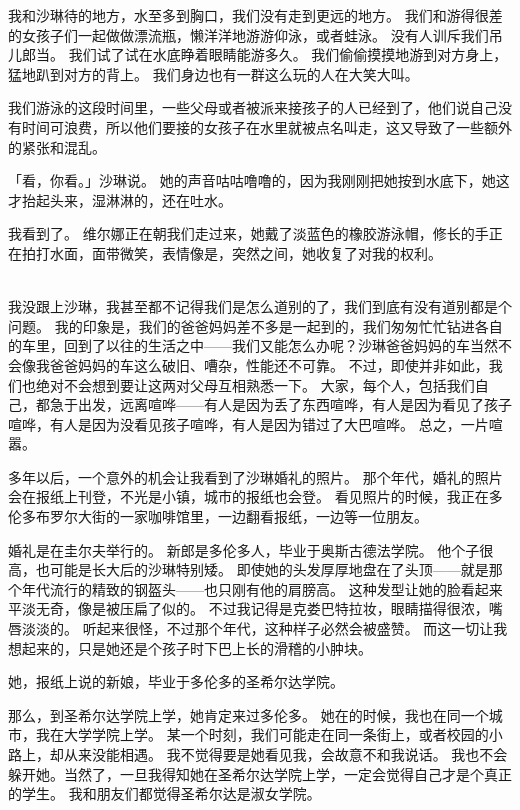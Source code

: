 \documentclass[UTF8]{ctexart}
\begin{document}
我和沙琳待的地方，水至多到胸口，我们没有走到更远的地方。
我们和游得很差的女孩子们一起做做漂流瓶，懒洋洋地游游仰泳，或者蛙泳。
没有人训斥我们吊儿郎当。
我们试了试在水底睁着眼睛能游多久。
我们偷偷摸摸地游到对方身上，猛地趴到对方的背上。
我们身边也有一群这么玩的人在大笑大叫。

我们游泳的这段时间里，一些父母或者被派来接孩子的人已经到了，他们说自己没有时间可浪费，所以他们要接的女孩子在水里就被点名叫走，这又导致了一些额外的紧张和混乱。

「看，你看。」沙琳说。
她的声音咕咕噜噜的，因为我刚刚把她按到水底下，她这才抬起头来，湿淋淋的，还在吐水。

我看到了。
维尔娜正在朝我们走过来，她戴了淡蓝色的橡胶游泳帽，修长的手正在拍打水面，面带微笑，表情像是，突然之间，她收复了对我的权利。

~\\

我没跟上沙琳，我甚至都不记得我们是怎么道别的了，我们到底有没有道别都是个问题。
我的印象是，我们的爸爸妈妈差不多是一起到的，我们匆匆忙忙钻进各自的车里，回到了以往的生活之中——我们又能怎么办呢？沙琳爸爸妈妈的车当然不会像我爸爸妈妈的车这么破旧、嘈杂，性能还不可靠。
不过，即使并非如此，我们也绝对不会想到要让这两对父母互相熟悉一下。
大家，每个人，包括我们自己，都急于出发，远离喧哗——有人是因为丢了东西喧哗，有人是因为看见了孩子喧哗，有人是因为没看见孩子喧哗，有人是因为错过了大巴喧哗。
总之，一片喧嚣。

多年以后，一个意外的机会让我看到了沙琳婚礼的照片。
那个年代，婚礼的照片会在报纸上刊登，不光是小镇，城市的报纸也会登。
看见照片的时候，我正在多伦多布罗尔大街的一家咖啡馆里，一边翻看报纸，一边等一位朋友。

婚礼是在圭尔夫举行的。
新郎是多伦多人，毕业于奥斯古德法学院。
他个子很高，也可能是长大后的沙琳特别矮。
即使她的头发厚厚地盘在了头顶——就是那个年代流行的精致的钢盔头——也只刚有他的肩膀高。
这种发型让她的脸看起来平淡无奇，像是被压扁了似的。
不过我记得是克娄巴特拉妆，眼睛描得很浓，嘴唇淡淡的。
听起来很怪，不过那个年代，这种样子必然会被盛赞。
而这一切让我想起来的，只是她还是个孩子时下巴上长的滑稽的小肿块。

她，报纸上说的新娘，毕业于多伦多的圣希尔达学院。

那么，到圣希尔达学院上学，她肯定来过多伦多。
她在的时候，我也在同一个城市，我在大学学院上学。
某一个时刻，我们可能走在同一条街上，或者校园的小路上，却从来没能相遇。
我不觉得要是她看见我，会故意不和我说话。
我也不会躲开她。当然了，一旦我得知她在圣希尔达学院上学，一定会觉得自己才是个真正的学生。
我和朋友们都觉得圣希尔达是淑女学院。
\end{document}
